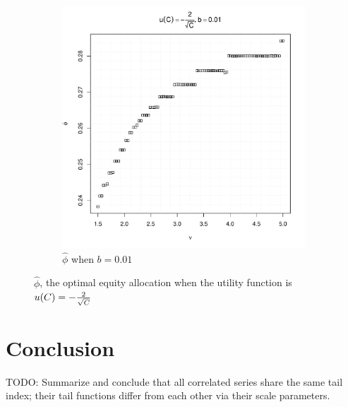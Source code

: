 \documentclass{article}
\begin{document}
\begin{figure}[htb!]
\begin{subfigure}[b]{0.5\linewidth}
    \includegraphics[width=\textwidth]{phi_hat_b_t5e-1.pdf}
    \caption{$\hat\phi$ when $b = 0.01$}
    \label{fig:phi_hat_b_t5e-1}
  \end{subfigure}
  \caption{$\hat\phi$, the optimal equity allocation when the utility
    function is $u(C) = -{2 \over \sqrt{C}}$
  }
\end{figure}


\section{Conclusion}
TODO: Summarize and conclude that all correlated series share the same
tail index; their tail functions differ from each other via their
scale parameters.
\end{document}
